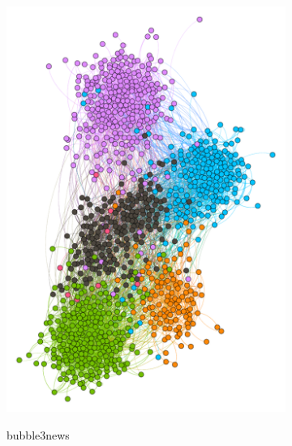 \begin{figure}
\begin{subfigure}[t]{0.25\textwidth}
    \label{fig:bubble3mod}
    \caption{}
  \end{subfigure}
  ~
  \begin{subfigure}[t]{0.35\textwidth}
    \includegraphics[width=\textwidth]{img/dim5_mod.pdf}
    \label{fig:bubble5mod}
    \caption{bubble3news}
  \end{subfigure}
  ~
  \begin{subfigure}[t]{0.35\textwidth}

\end{subfigure}
\end{figure}

